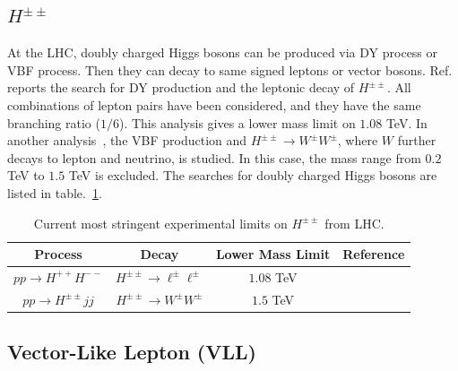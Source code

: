 \documentclass[a4paper,11pt]{article}
\begin{document}
\subsection{$H^{\pm\pm}$}

At the LHC, doubly charged Higgs bosons can be produced via DY process or VBF process. 
Then they can decay to same signed leptons or vector bosons. 
Ref.~\cite{ATLAS:2022pbd} reports the search for DY production and the leptonic decay of $H^{\pm\pm}$. 
All combinations of lepton pairs have been considered, and they have the same branching ratio ($1/6$). 
This analysis gives a lower mass limit on $1.08$ TeV.
In another analysis~\cite{ATLAS:2024txt}, the VBF production and $H^{\pm\pm}\to W^\pm W^\pm$, 
where $W$ further decays to lepton and neutrino, 
is studied. 
In this case, the mass range from $0.2$ TeV to $1.5$ TeV is excluded.
The searches for doubly charged Higgs bosons are listed in table.~\ref{table:doublycharge}.

\begin{table}
  \centering 
    \begin{tabular}{cccc}
    Process  & Decay & Lower Mass Limit & Reference \\
     \hline
$pp\to H^{++}H^{--}$  & $H^{\pm\pm}\to \ell^\pm\ell^\pm$ &   
$1.08$ TeV       &     \cite{ATLAS:2022pbd}        \\%
$pp\to H^{\pm\pm} jj$  & $H^{\pm\pm}\to W^\pm W^\pm$ &   
$1.5$ TeV       &     \cite{ATLAS:2024txt}        \\%
    \hline
    \end{tabular}
  \caption{Current most stringent experimental limits on $H^{\pm\pm}$ from LHC.}
  \label{table:doublycharge}
  \end{table}    

\subsection{Vector-Like Lepton (VLL)}
\end{document}
